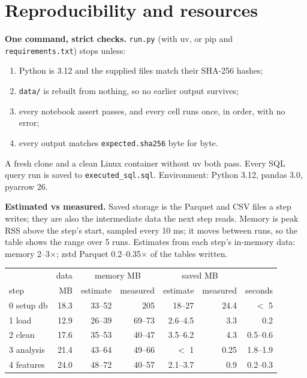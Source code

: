 \documentclass[11pt,a4paper]{article}
\newcommand{\file}[1]{\texttt{#1}}
\begin{document}
\section{Reproducibility and resources}

\textbf{One command, strict checks.} \file{run.py} (with uv, or pip and \file{requirements.txt}) stops unless:
\begin{enumerate}[leftmargin=1.5em]
  \item Python is 3.12 and the supplied files match their SHA-256 hashes;
  \item \file{data/} is rebuilt from nothing, so no earlier output survives;
  \item every notebook assert passes, and every cell runs once, in order, with no error;
  \item every output matches \file{expected.sha256} byte for byte.
\end{enumerate}
A fresh clone and a clean Linux container without uv both pass. Every SQL query run is saved to \file{executed\_sql.sql}. Environment: Python 3.12, pandas 3.0, pyarrow 26.

\textbf{Estimated vs measured.} Saved storage is the Parquet and CSV files a step writes; they are also the intermediate data the next step reads. Memory is peak RSS above the step's start, sampled every 10 ms; it moves between runs, so the table shows the range over 5 runs. Estimates from each step's in-memory data: memory 2--3$\times$; zstd Parquet 0.2--0.35$\times$ of the tables written.

\begin{center}\small
\begin{tabular}{lrrrrrr}
\toprule
 & data & \multicolumn{2}{c}{memory MB} & \multicolumn{2}{c}{saved MB} & \\
step & MB & estimate & measured & estimate & measured & seconds \\
\midrule
0 setup db & 18.3 & 33--52 & 205 & 18--27 & 24.4 & $<$ 5 \\
1 load & 12.9 & 26--39 & 69--73 & 2.6--4.5 & 3.3 & 0.2 \\
2 clean & 17.6 & 35--53 & 40--47 & 3.5--6.2 & 4.3 & 0.5--0.6 \\
3 analysis & 21.4 & 43--64 & 49--66 & $<$ 1 & 0.25 & 1.8--1.9 \\
4 features & 24.0 & 48--72 & 40--57 & 2.1--3.7 & 0.9 & 0.2--0.3 \\
\bottomrule
\end{tabular}
\end{center}
\end{document}
